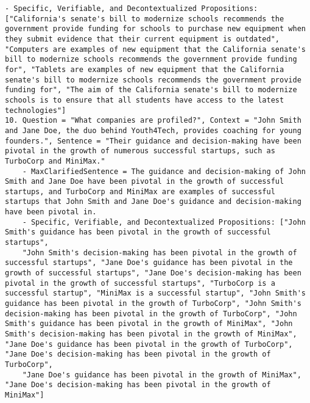 \begin{tcolorbox}
\begin{lstlisting}[breaklines=true, breakindent=0pt, basicstyle=\small\ttfamily\raggedright, xleftmargin=-5pt, frame=none, xrightmargin=-5pt, aboveskip=-2pt, belowskip=-2pt]
    - Specific, Verifiable, and Decontextualized Propositions: ["California's senate's bill to modernize schools recommends the government provide funding for schools to purchase new equipment when they submit evidence that their current equipment is outdated", "Computers are examples of new equipment that the California senate's bill to modernize schools recommends the government provide funding for", "Tablets are examples of new equipment that the California senate's bill to modernize schools recommends the government provide funding for", "The aim of the California senate's bill to modernize schools is to ensure that all students have access to the latest technologies"]
10. Question = "What companies are profiled?", Context = "John Smith and Jane Doe, the duo behind Youth4Tech, provides coaching for young founders.", Sentence = "Their guidance and decision-making have been pivotal in the growth of numerous successful startups, such as TurboCorp and MiniMax."
    - MaxClarifiedSentence = The guidance and decision-making of John Smith and Jane Doe have been pivotal in the growth of successful startups, and TurboCorp and MiniMax are examples of successful startups that John Smith and Jane Doe's guidance and decision-making have been pivotal in.
    - Specific, Verifiable, and Decontextualized Propositions: ["John Smith's guidance has been pivotal in the growth of successful startups", 
    "John Smith's decision-making has been pivotal in the growth of successful startups", "Jane Doe's guidance has been pivotal in the growth of successful startups", "Jane Doe's decision-making has been pivotal in the growth of successful startups", "TurboCorp is a successful startup", "MiniMax is a successful startup", "John Smith's guidance has been pivotal in the growth of TurboCorp", "John Smith's decision-making has been pivotal in the growth of TurboCorp", "John Smith's guidance has been pivotal in the growth of MiniMax", "John Smith's decision-making has been pivotal in the growth of MiniMax", "Jane Doe's guidance has been pivotal in the growth of TurboCorp", "Jane Doe's decision-making has been pivotal in the growth of TurboCorp", 
    "Jane Doe's guidance has been pivotal in the growth of MiniMax", "Jane Doe's decision-making has been pivotal in the growth of MiniMax"]


\end{lstlisting}
\end{tcolorbox}
